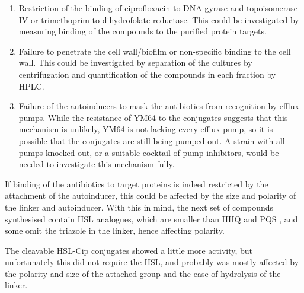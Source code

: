 \begin{enumerate}
\item Restriction of the binding of ciprofloxacin  to DNA gyrase and topoisomerase IV\cite{Drlica1997} or trimethoprim  to dihydrofolate reductase\cite{Brogden1982}. This could be investigated by measuring binding of the compounds to the purified protein targets.

\item Failure to penetrate the cell wall/biofilm or non-specific binding to the cell wall. This could be investigated by separation of the cultures by centrifugation and quantification of the compounds in each fraction by HPLC.

\item Failure of the autoinducers to mask the antibiotics from recognition by efflux pumps. While the resistance of YM64 to the conjugates suggests that this mechanism is unlikely, YM64 is not lacking every efflux pump\cite{Poole2004,Morita2001}, so it is possible that the conjugates are still being pumped out. A strain with all pumps knocked out, or a suitable cocktail of pump inhibitors, would be needed to investigate this mechanism fully.
\end{enumerate}

If binding of the antibiotics to target proteins is indeed restricted by the attachment of the autoinducer, this could be affected by the size and polarity of the linker and autoinducer. With this in mind, the next set of compounds synthesised contain HSL analogues, which are smaller than HHQ  and PQS , and some omit the triazole in the linker, hence affecting polarity.

The cleavable HSL-Cip conjugates showed a little more activity, but unfortunately this did not require the HSL, and probably was mostly affected by the polarity and size of the attached group and the ease of hydrolysis of the linker.